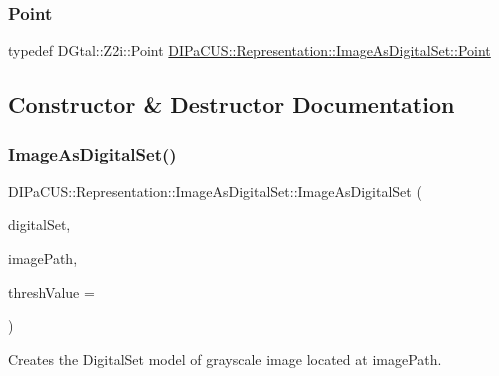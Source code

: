 \subsubsection{\texorpdfstring{Point}{Point}}
{\footnotesize\ttfamily typedef D\+Gtal\+::\+Z2i\+::\+Point \mbox{\hyperlink{structDIPaCUS_1_1Representation_1_1ImageAsDigitalSet_a16ad0b192ebf99b4d55bade91a62c847}{D\+I\+Pa\+C\+U\+S\+::\+Representation\+::\+Image\+As\+Digital\+Set\+::\+Point}}}



\subsection{Constructor \& Destructor Documentation}
\mbox{\label{structDIPaCUS_1_1Representation_1_1ImageAsDigitalSet_a42e0b9a725f2714763ac461e8941f4c3}} 
\subsubsection{\texorpdfstring{Image\+As\+Digital\+Set()}{ImageAsDigitalSet()}\hspace{0.1cm}{\footnotesize\ttfamily [1/2]}}
{\footnotesize\ttfamily D\+I\+Pa\+C\+U\+S\+::\+Representation\+::\+Image\+As\+Digital\+Set\+::\+Image\+As\+Digital\+Set (\begin{DoxyParamCaption}\item[{\mbox{\hyperlink{structDIPaCUS_1_1Representation_1_1ImageAsDigitalSet_a3a19b478392377afed24a5234dfdbd68}{Digital\+Set}} \&}]{digital\+Set,  }\item[{const std\+::string \&}]{image\+Path,  }\item[{unsigned char}]{thresh\+Value = {} }\end{DoxyParamCaption})}



Creates the Digital\+Set model of grayscale image located at image\+Path. 

